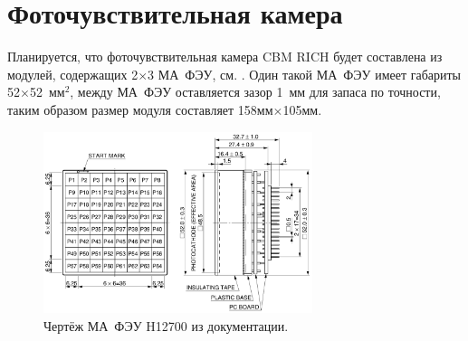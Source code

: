 %                                      

\section{Фоточувствительная камера}\label{sec:secRICHgeoCamera}

Планируется, что фоточувствительная камера CBM RICH будет составлена из модулей, содержащих 2$\times$3 МА~ФЭУ, см. . Один такой МА~ФЭУ имеет габариты 52$\times$52~мм$^2$, между МА~ФЭУ оставляется зазор 1~мм для запаса по точности, таким образом размер модуля составляет 158мм$\times$105мм.

\begin{figure}[H]
\centering
\includegraphics[width=0.7\textwidth]{pictures/H12700_drawing.png}
\caption{Чертёж МА~ФЭУ H12700 из документации.}
\label{fig:H12700drawing}
\end{figure}

